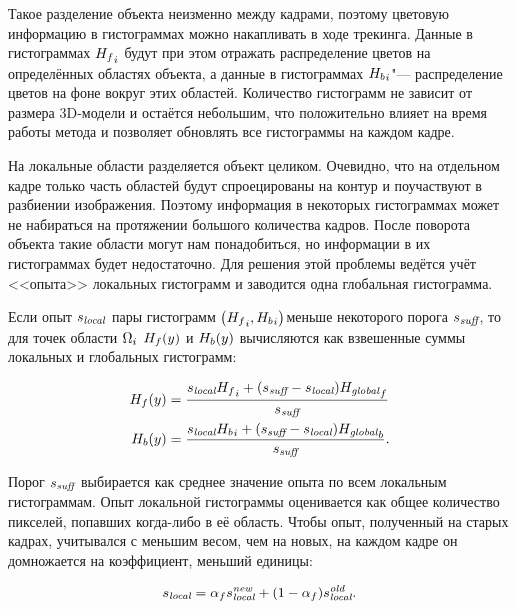 Такое разделение объекта неизменно между кадрами, поэтому цветовую информацию
в гистограммах можно накапливать в ходе трекинга.
Данные в гистограммах ${H_f}_i$ будут при этом отражать распределение
цветов на определённых областях объекта, а данные в гистограммах
${H_b}_i$"--- распределение цветов на фоне вокруг этих областей.
Количество гистограмм не зависит от размера 3D-модели и остаётся небольшим, что
положительно влияет на время работы метода и позволяет обновлять все гистограммы
на каждом кадре.

На локальные области разделяется объект целиком. 
Очевидно, что на отдельном кадре только часть областей будут спроецированы на
контур и поучаствуют в разбиении изображения.
Поэтому информация в некоторых гистограммах может не набираться на протяжении
большого количества кадров.
После поворота объекта такие области могут нам понадобиться, но информации в
их гистограммах будет недостаточно.
Для решения этой проблемы ведётся учёт <<опыта>> локальных гистограмм и
заводится одна глобальная гистограмма.

Если опыт $s_{\text{\it local}}$ пары гистограмм $\left( {H_f}_i,
{H_b}_i \right)$меньше некоторого порога
$s_{\text{\it suff}}$, то для точек области $\Omega_i$ $H_f(y)$ и $H_b(y)$
вычисляются
как
взвешенные суммы локальных и глобальных гистограмм:

\begin{align}
\label{eqn:histo_skill}
H_f(y) &= \dfrac{s_{\text{\it local}} {H_f}_i + (s_{\text{\it suff}} -
s_{\text{\it local}})
        {H_{\text {\it global}}}_f}{s_{\text{\it suff}}} \\
H_b(y) &= \dfrac{s_{\text{\it local}} {H_b}_i + (s_{\text{\it suff}} -
s_{\text{\it local}})
        {H_{\text {\it global}}}_b}{s_{\text{\it suff}}}
\text{.}
\end{align}

Порог $s_{\text{\it suff}}$ выбирается как среднее значение опыта по всем
локальным
гистограммам.
Опыт локальной гистограммы оценивается как общее количество пикселей, попавших
когда-либо в её область.
Чтобы опыт, полученный на старых кадрах, учитывался с меньшим весом, чем на
новых, на
каждом кадре он домножается на коэффициент, меньший единицы:

\begin{equation}
s_{\text{\it local}} = \alpha_f s_{\text{\it local}}^{\text{\it new}} + (1 -
\alpha_f) s_{\text{\it local}}^{\text{\it old}}
\text{.}
\end{equation}

